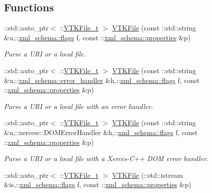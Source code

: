 \subsection*{Functions}
\begin{DoxyCompactItemize}
\item 
\+::std\+::auto\+\_\+ptr$<$ \+::\hyperlink{classVTKFile__t}{V\+T\+K\+File\+\_\+t} $>$ \hyperlink{vtk-unstructured_8cpp_a7c23f47cd1d791b22bff78904defd7eb}{V\+T\+K\+File} (const \+::std\+::string \&u,\+::\hyperlink{namespacexml__schema_a8d981c127a1f5106d04ad5853e707361}{xml\+\_\+schema\+::flags} f, const \+::\hyperlink{namespacexml__schema_aba199bc39c8b21c427369c27d2bcfc8c}{xml\+\_\+schema\+::properties} \&p)
\begin{DoxyCompactList}\small\item\em Parse a U\+R\+I or a local file. \end{DoxyCompactList}\item 
\+::std\+::auto\+\_\+ptr$<$ \+::\hyperlink{classVTKFile__t}{V\+T\+K\+File\+\_\+t} $>$ \hyperlink{vtk-unstructured_8cpp_a88b6537c9daeb6b997120080b41f58e9}{V\+T\+K\+File} (const \+::std\+::string \&u,\+::\hyperlink{namespacexml__schema_abdee01986b8e16f04af47dd12038261e}{xml\+\_\+schema\+::error\+\_\+handler} \&h,\+::\hyperlink{namespacexml__schema_a8d981c127a1f5106d04ad5853e707361}{xml\+\_\+schema\+::flags} f, const \+::\hyperlink{namespacexml__schema_aba199bc39c8b21c427369c27d2bcfc8c}{xml\+\_\+schema\+::properties} \&p)
\begin{DoxyCompactList}\small\item\em Parse a U\+R\+I or a local file with an error handler. \end{DoxyCompactList}\item 
\+::std\+::auto\+\_\+ptr$<$ \+::\hyperlink{classVTKFile__t}{V\+T\+K\+File\+\_\+t} $>$ \hyperlink{vtk-unstructured_8cpp_acec6a0976b0c88545964e132138b0380}{V\+T\+K\+File} (const \+::std\+::string \&u,\+::xercesc\+::\+D\+O\+M\+Error\+Handler \&h,\+::\hyperlink{namespacexml__schema_a8d981c127a1f5106d04ad5853e707361}{xml\+\_\+schema\+::flags} f, const \+::\hyperlink{namespacexml__schema_aba199bc39c8b21c427369c27d2bcfc8c}{xml\+\_\+schema\+::properties} \&p)
\begin{DoxyCompactList}\small\item\em Parse a U\+R\+I or a local file with a Xerces-\/\+C++ D\+O\+M error handler. \end{DoxyCompactList}\item 
\+::std\+::auto\+\_\+ptr$<$ \+::\hyperlink{classVTKFile__t}{V\+T\+K\+File\+\_\+t} $>$ \hyperlink{vtk-unstructured_8cpp_a614c44588111461ff8af6c4958a7f346}{V\+T\+K\+File} (\+::std\+::istream \&is,\+::\hyperlink{namespacexml__schema_a8d981c127a1f5106d04ad5853e707361}{xml\+\_\+schema\+::flags} f, const \+::\hyperlink{namespacexml__schema_aba199bc39c8b21c427369c27d2bcfc8c}{xml\+\_\+schema\+::properties} \&p)

\end{DoxyCompactItemize}
